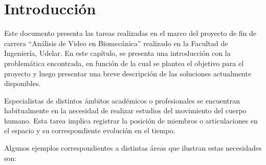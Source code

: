 \section{Introducción}

Este documento presenta las tareas realizadas en el marco del proyecto de fin de carrera ``Análisis de Video en Biomecánica'' realizado en la Facultad de Ingeniería, Udelar. En este capítulo, se presenta una introducción con la problemática encontrada, en función de la cual se plantea el objetivo para el proyecto y luego presentar 
una breve descripción de las soluciones actualmente disponibles.
\vspace{5 mm}

Especialistas de distintos ámbitos académicos o profesionales se encuentran habitualmente en la necesidad de realizar estudios del movimiento del cuerpo humano. Esta tarea implica registrar la posición de miembros o articulaciones en el espacio y su correspondiente evolución en el tiempo.

Algunos ejemplos correspondientes a distintas áreas que ilustran estas necesidades son:

